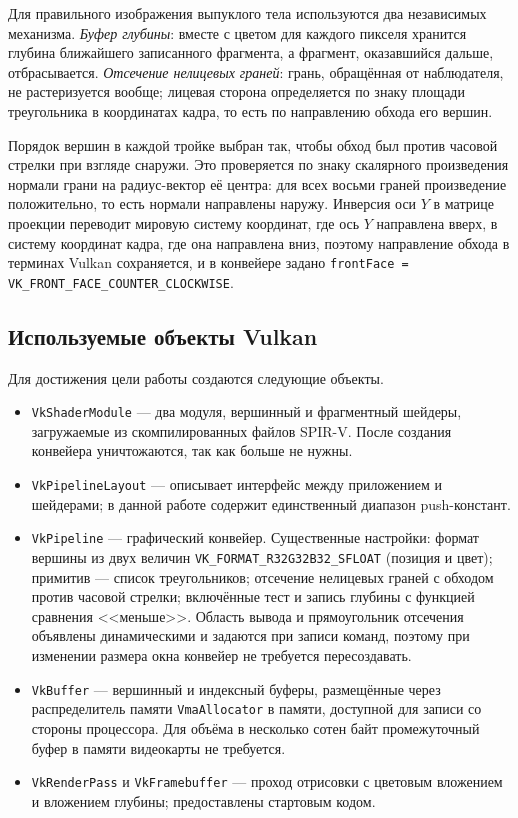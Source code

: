 \documentclass[14pt,a4paper]{extarticle}
\begin{document}
Для правильного изображения выпуклого тела используются два независимых
механизма. \emph{Буфер глубины}: вместе с цветом для каждого пикселя хранится
глубина ближайшего записанного фрагмента, а фрагмент, оказавшийся дальше,
отбрасывается. \emph{Отсечение нелицевых граней}: грань, обращённая от
наблюдателя, не растеризуется вообще; лицевая сторона определяется по знаку
площади треугольника в координатах кадра, то есть по направлению обхода его
вершин.

Порядок вершин в каждой тройке выбран так, чтобы обход был против часовой
стрелки при взгляде снаружи. Это проверяется по знаку скалярного произведения
нормали грани на радиус-вектор её центра: для всех восьми граней произведение
положительно, то есть нормали направлены наружу. Инверсия оси $Y$ в матрице
проекции переводит мировую систему координат, где ось $Y$ направлена вверх, в
систему координат кадра, где она направлена вниз, поэтому направление обхода в
терминах Vulkan сохраняется, и в конвейере задано
\texttt{frontFace = VK\_FRONT\_FACE\_COUNTER\_CLOCKWISE}.

\subsection{Используемые объекты Vulkan}

Для достижения цели работы создаются следующие объекты.

\begin{itemize}[leftmargin=*]
	\item \texttt{VkShaderModule} — два модуля, вершинный и фрагментный шейдеры,
	загружаемые из скомпилированных файлов SPIR-V. После создания конвейера
	уничтожаются, так как больше не нужны.

	\item \texttt{VkPipelineLayout} — описывает интерфейс между приложением и
	шейдерами; в данной работе содержит единственный диапазон push-констант.

	\item \texttt{VkPipeline} — графический конвейер. Существенные настройки:
	формат вершины из двух величин \texttt{VK\_FORMAT\_R32G32B32\_SFLOAT}
	(позиция и цвет); примитив — список треугольников; отсечение нелицевых
	граней с обходом против часовой стрелки; включённые тест и запись глубины с
	функцией сравнения <<меньше>>. Область вывода и прямоугольник отсечения
	объявлены динамическими и задаются при записи команд, поэтому при изменении
	размера окна конвейер не требуется пересоздавать.

	\item \texttt{VkBuffer} — вершинный и индексный буферы, размещённые через
	распределитель памяти \texttt{VmaAllocator} в памяти, доступной для записи
	со стороны процессора. Для объёма в несколько сотен байт промежуточный
	буфер в памяти видеокарты не требуется.

	\item \texttt{VkRenderPass} и \texttt{VkFramebuffer} — проход отрисовки с
	цветовым вложением и вложением глубины; предоставлены стартовым кодом.
\end{itemize}
\end{document}
